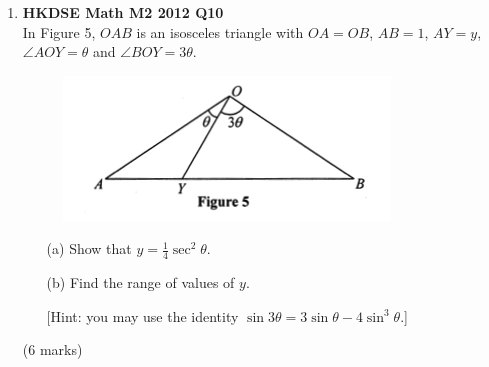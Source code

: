 \documentclass{report}
\begin{document}
\begin{enumerate}
	\item \textbf{HKDSE Math M2 2012 Q10}\\
	In Figure 5, $OAB$ is an isosceles triangle with $OA = OB$, $AB = 1$, $AY = y$, $\angle AOY = \theta$ and $\angle BOY = 3\theta$. 
	\begin{figure}[H]
		\centering
		\includegraphics[width = .5\linewidth]{2012Figure5}
	\end{figure}
	\begin{enumerate}
		\item [(a)]Show that $y = \displaystyle\frac{1}{4}\sec^2{\theta}$.
		\item [(b)]Find the range of values of $y$. 
		
		[Hint: you may use the identity $\sin{3\theta} = 3\sin{\theta} - 4\sin^3{\theta}$.]
	\end{enumerate}
	(6 marks)


\end{enumerate}
\end{document}
